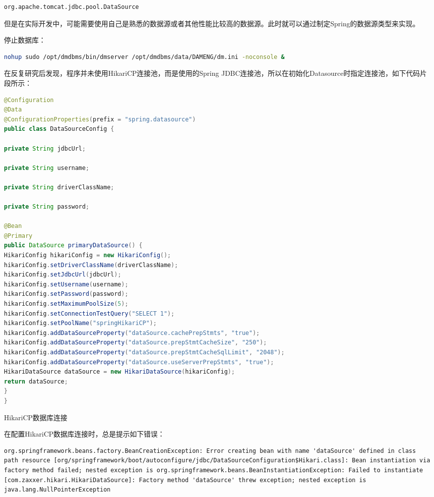\documentclass[11pt,fleqn]{book}
\makeatletter
\numberwithin{dummy}{section}
\theoremstyle{ocrenumbox}
\theoremstyle{blacknumex}
\theoremstyle{blacknumbox}
\theoremstyle{ocrenum}
\renewcommand{\subsection}{\@startsection {subsection}{2}{\z@}
	{-3ex \@plus -0.1ex \@minus -.4ex}
	{0.5ex \@plus.2ex }
	{\normalfont\sffamily\bfseries}}
\makeatother
\begin{document}
\begin{lstlisting}
org.apache.tomcat.jdbc.pool.DataSource
\end{lstlisting}

但是在实际开发中，可能需要使用自己是熟悉的数据源或者其他性能比较高的数据源。此时就可以通过制定Spring的数据源类型来实现。

停止数据库：

\begin{lstlisting}[language=Bash]
nohup sudo /opt/dmdbms/bin/dmserver /opt/dmdbms/data/DAMENG/dm.ini -noconsole &
\end{lstlisting}

在反复研究后发现，程序并未使用HikariCP连接池，而是使用的Spring JDBC连接池，所以在初始化Datasource时指定连接池，如下代码片段所示：

\begin{lstlisting}[language=Java]
@Configuration
@Data
@ConfigurationProperties(prefix = "spring.datasource")
public class DataSourceConfig {

private String jdbcUrl;

private String username;

private String driverClassName;

private String password;

@Bean
@Primary
public DataSource primaryDataSource() {
HikariConfig hikariConfig = new HikariConfig();
hikariConfig.setDriverClassName(driverClassName);
hikariConfig.setJdbcUrl(jdbcUrl);
hikariConfig.setUsername(username);
hikariConfig.setPassword(password);
hikariConfig.setMaximumPoolSize(5);
hikariConfig.setConnectionTestQuery("SELECT 1");
hikariConfig.setPoolName("springHikariCP");
hikariConfig.addDataSourceProperty("dataSource.cachePrepStmts", "true");
hikariConfig.addDataSourceProperty("dataSource.prepStmtCacheSize", "250");
hikariConfig.addDataSourceProperty("dataSource.prepStmtCacheSqlLimit", "2048");
hikariConfig.addDataSourceProperty("dataSource.useServerPrepStmts", "true");
HikariDataSource dataSource = new HikariDataSource(hikariConfig);
return dataSource;
}
}
\end{lstlisting}

\subsection{HikariCP数据库连接}

在配置HikariCP数据库连接时，总是提示如下错误：

\begin{lstlisting}
org.springframework.beans.factory.BeanCreationException: Error creating bean with name 'dataSource' defined in class path resource [org/springframework/boot/autoconfigure/jdbc/DataSourceConfiguration$Hikari.class]: Bean instantiation via factory method failed; nested exception is org.springframework.beans.BeanInstantiationException: Failed to instantiate [com.zaxxer.hikari.HikariDataSource]: Factory method 'dataSource' threw exception; nested exception is java.lang.NullPointerException
\end{lstlisting}
\end{document}
